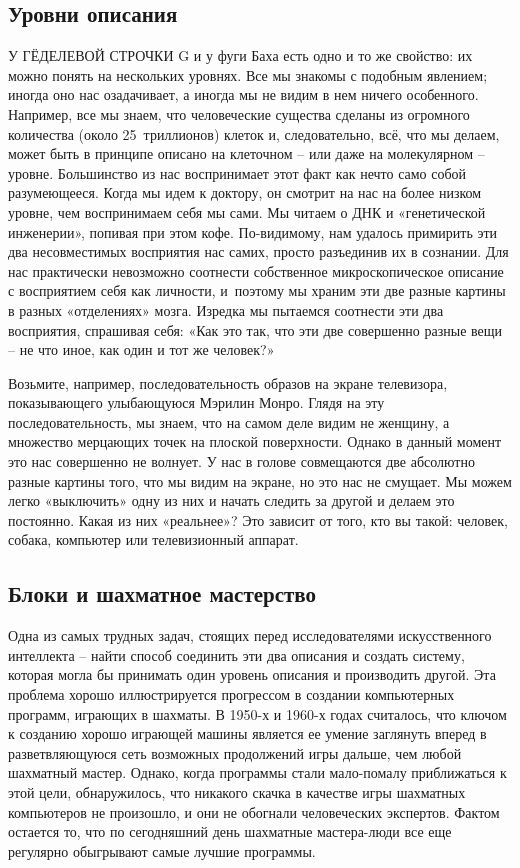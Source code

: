 \documentclass[../main.tex]{subfiles}
\begin{document}

\subsection{Уровни описания}

У ГЁДЕЛЕВОЙ СТРОЧКИ G и у фуги Баха есть одно и то же свойство: их можно понять на нескольких уровнях. Все мы знакомы с подобным явлением; иногда оно нас озадачивает, а иногда мы не видим в нем ничего особенного. Например, все мы знаем, что человеческие существа сделаны из огромного количества (около 25~триллионов) клеток и, следовательно, всё, что мы делаем, может быть в принципе описано на клеточном \--- или даже на молекулярном \--- уровне. Большинство из нас воспринимает этот факт как нечто само собой разумеющееся. Когда мы идем к доктору, он смотрит на нас на более низком уровне, чем воспринимаем себя мы сами. Мы читаем о ДНК и «генетической инженерии», попивая при этом кофе. По-видимому, нам удалось примирить эти два несовместимых восприятия нас самих, просто разъединив их в сознании. Для нас практически невозможно соотнести собственное микроскопическое описание с восприятием себя как личности, и~поэтому мы храним эти две разные картины в разных «отделениях» мозга. Изредка мы пытаемся соотнести эти два восприятия, спрашивая себя: «Как это так, что эти две совершенно разные вещи \--- не что иное, как один и тот же человек?»

Возьмите, например, последовательность образов на экране телевизора, показывающего улыбающуюся Мэрилин Монро. Глядя на эту последовательность, мы знаем, что на самом деле видим не женщину, а множество мерцающих точек на плоской поверхности. Однако в данный момент это нас совершенно не волнует. У нас в голове совмещаются две абсолютно разные картины того, что мы видим на экране, но это нас не смущает. Мы можем легко «выключить» одну из них и начать следить за другой и делаем это постоянно. Какая из них «реальнее»? Это зависит от того, кто вы такой: человек, собака, компьютер или телевизионный аппарат.


\subsection{Блоки и шахматное мастерство}

Одна из самых трудных задач, стоящих перед исследователями искусственного интеллекта \--- найти способ соединить эти два описания и создать систему, которая могла бы принимать один уровень описания и производить другой. Эта проблема хорошо иллюстрируется прогрессом в создании компьютерных программ, играющих в шахматы. В 1950-х и 1960-х годах считалось, что ключом к созданию хорошо играющей машины является ее умение заглянуть вперед в разветвляющуюся сеть возможных продолжений игры дальше, чем любой шахматный мастер. Однако, когда программы стали мало-помалу приближаться к этой цели, обнаружилось, что никакого скачка в качестве игры шахматных компьютеров не произошло, и они не обогнали человеческих экспертов. Фактом остается то, что по сегодняшний день шахматные мастера-люди все еще регулярно обыгрывают самые лучшие программы.
\end{document}
